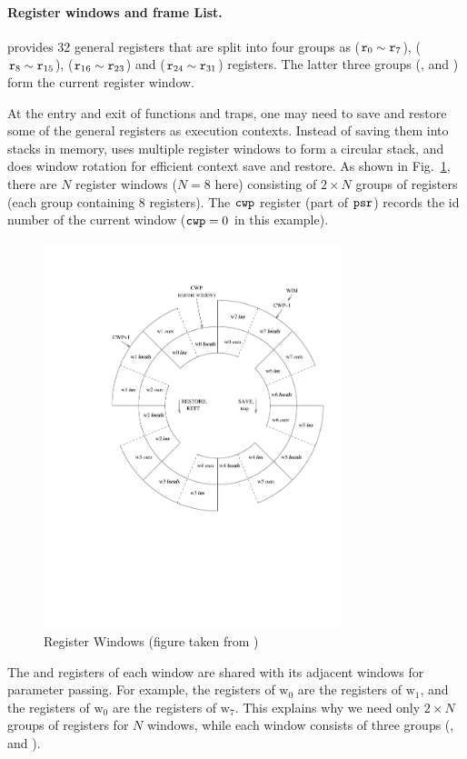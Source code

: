 \paragraph{\textbf{Register windows and frame List.}}
\sparc{} provides 32 general registers that are split into
four groups
as \globalRN{} ($\texttt{r}_{0} \sim \texttt{r}_{7}$),
\outRN{} ($\texttt{r}_{8} \sim \texttt{r}_{15}$), \localRN ($\texttt{r}_{16} \sim \texttt{r}_{23}$)
and \inRN{} ($\texttt{r}_{24} \sim \texttt{r}_{31}$) registers.
The latter three groups (\outRN{}, \localRN{} and \inRN{})
form the current register window.

At the entry and exit of functions and traps, one may need to
save and restore some of the general registers as execution
contexts. Instead of saving them into stacks in memory,
\sparc{} uses multiple register windows to form a circular
stack, and does window rotation for efficient context save and restore.
As shown in Fig.~\ref{fig:RegisterWindows}, there are $N$
register windows ($N=8$ here) consisting of $2\times N$
groups of registers (each group containing 8 registers).
The $\texttt{cwp}$ register (part of $\texttt{psr}$) records the id number
of the current window ($\texttt{cwp}=0$ in this example).
\begin{figure}[!t]
	\centering
	\includegraphics[width=8.7cm]{window}
	\caption{Register Windows (figure taken from \cite{sparc})}
	\label{fig:RegisterWindows}
\end{figure}

The \inRN{} and \outRN{} registers of each window are shared
with its adjacent windows for parameter passing.
For example, the \inRN{} registers of $\text{w}_0$
are the \outRN{} registers of $\text{w}_1$,
and the \outRN{} registers of $\text{w}_0$
are the \inRN{} registers of $\text{w}_7$.
This explains
why we need only $2\times N$ groups of registers for
$N$ windows, while each window consists of
three groups (\outRN{}, \localRN{} and \inRN{}).

